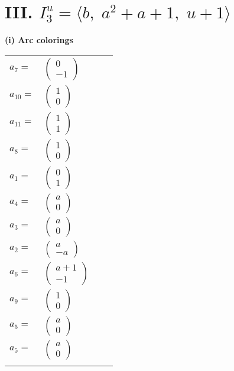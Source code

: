 \documentclass[1p]{elsarticle_modified}
\theoremstyle{definition}
\begin{document}
\centering \section*{III. $I^u_{3}= \langle b,\;a^2+a+1,\;u+1 \rangle$}
\flushleft \textbf{(i) Arc colorings}\\
\begin{tabular}{m{7pt} m{180pt} m{7pt} m{180pt} }
\flushright $a_{7}=$&$\begin{pmatrix}0\\-1\end{pmatrix}$ \\
\flushright $a_{10}=$&$\begin{pmatrix}1\\0\end{pmatrix}$ \\
\flushright $a_{11}=$&$\begin{pmatrix}1\\1\end{pmatrix}$ \\
\flushright $a_{8}=$&$\begin{pmatrix}1\\0\end{pmatrix}$ \\
\flushright $a_{1}=$&$\begin{pmatrix}0\\1\end{pmatrix}$ \\
\flushright $a_{4}=$&$\begin{pmatrix}a\\0\end{pmatrix}$ \\
\flushright $a_{3}=$&$\begin{pmatrix}a\\0\end{pmatrix}$ \\
\flushright $a_{2}=$&$\begin{pmatrix}a\\- a\end{pmatrix}$ \\
\flushright $a_{6}=$&$\begin{pmatrix}a+1\\-1\end{pmatrix}$ \\
\flushright $a_{9}=$&$\begin{pmatrix}1\\0\end{pmatrix}$ \\
\flushright $a_{5}=$&$\begin{pmatrix}a\\0\end{pmatrix}$\\ \flushright $a_{5}=$&$\begin{pmatrix}a\\0\end{pmatrix}$\\&\end{tabular}
\end{document}
